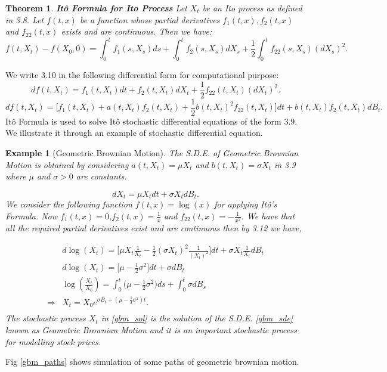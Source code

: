 \documentclass[12pt]{report}
\newtheorem{theorem}{Theorem}[section]
\newtheorem{example}{Example}[section]
\begin{document}
\begin{theorem}{\textbf{Itô Formula for Ito Process}}
Let $X_t$ be an Ito process as defined in 3.8. Let $f(t,x)$ be a function whose partial derivatives $f_1(t,x),f_2(t,x)$ and $f_{22}(t,x)$ exists and are continuous. Then we have:
\begin{equation}
    f(t,X_t) - f(X_0,0) = \int_{0}^{t}f_1(s,X_s)ds + \int_{0}^{t}f_2(s,X_s)dX_s  + \frac{1}{2} \int_{0}^{t}f_{22}(s,X_s)(dX_s)^2.
\end{equation}
 
\end{theorem}
We write 3.10 in the following differential form for computational purpose:
\begin{equation}
    df(t,X_t) = f_1(t,X_t) dt + f_2(t,X_t) dX_t + \frac{1}{2} f_{22}(t,X_t) (dX_t)^2. 
\end{equation}
\begin{equation}
    df(t,X_t) = \Big[f_1 (t,X_t) +a(t,X_t) f_2(t,X_t) +  \frac{1}{2} b(t,X_t)^2 f_{22}(t,X_t)\Big] dt  + b(t,X_t) f_2(t,X_t) dB_t. 
\end{equation}
Itô Formula is used to solve Itô stochastic differential equations of the form 3.9. We illustrate it through an example of stochastic differential equation.
\begin{example}[Geometric Brownian Motion]
The S.D.E. of Geometric Brownian Motion is obtained by considering $a(t,X_t) = \mu X_{t}$ and $b(t,X_t) = \sigma X_{t}$ in 3.9 where $\mu$ and $\sigma > 0$  are constants.\par
\begin{equation}
    dX_t = \mu X_{t}dt + \sigma X_{t}dB_t. 
\label{gbm_sde}    
\end{equation}
We consider the following function $f(t,x) = \log(x)$ for applying Itô's Formula. Now $f_{1}(t,x)=0$,$f_{2}(t,x)=\frac{1}{x}$ and $f_{22}(t,x)=-\frac{1}{x^{2}}$. We have that all the required partial derivatives exist and are continuous then by 3.12 we have, \par
\begin{equation}
\begin{align*}
    &d\log(X_t) = \Big[\mu X_t  \frac{1}{X_t} - \frac{1}{2} (\sigma X_t)^2 \frac{1}{(X_t)^{2}}\Big]dt + \sigma X_t \frac{1}{X_t} dB_t\\
    &d\log(X_t) = \Big[\mu - \frac{1}{2} \sigma^2\Big]dt + \sigma dB_t\\
    &\log(\frac{X_t}{X_0}) = \int_{0}^{t}\Big(\mu - \frac{1}{2}\sigma^{2}\Big)ds + \int_{0}^{t}\sigma dB_s\\
    \Longrightarrow &X_t = X_0 e^{\sigma B_t + (\mu - \frac{1}{2}\sigma^{2})t}.\\
\end{align*}
\label{gbm_sol}
\end{equation}
The stochastic process $X_t$ in \ref{gbm_sol} is the solution of the S.D.E. \ref{gbm_sde} known as Geometric Brownian Motion and it is an important stochastic process for modelling stock prices.


\end{example}
Fig \ref{gbm_paths} shows simulation of some paths of geometric brownian motion.
\end{document}
